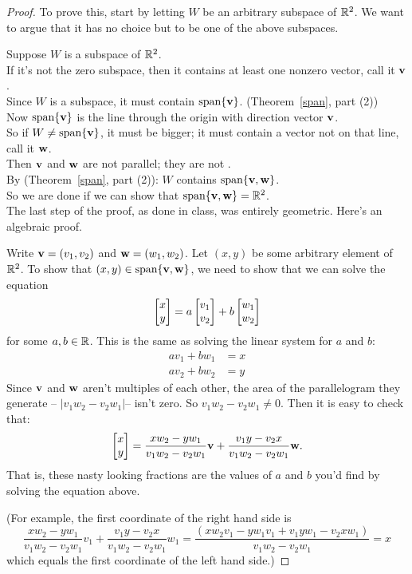 \begin{proof}
To prove this, start by letting $W$ be an arbitrary subspace of $\mathbb{R}^2$.
We want to argue that it has no choice but to be one of the above 
subspaces.

Suppose $W$ is a subspace of $\mathbb{R}^2$.  \\
If it's not the zero subspace,
then it contains at least one nonzero vector, call it $\mathbf{v}$.  \\
Since $W$ is a subspace, it must contain $\textrm{span}\{\mathbf{v}\}$. (Theorem~\ref{span}, part (2))\\
Now $\textrm{span}\{\mathbf{v}\}$ is the line through the origin with direction vector $\mathbf{v}$.\\
So if $W \neq \textrm{span}\{\mathbf{v}\}$, it must be bigger; it must 
 contain
a vector not on that line, call it $\mathbf{w}$.\\
Then $\mathbf{v}$ and $\mathbf{w}$ are not parallel; they are not .\\  
By (Theorem~\ref{span}, part (2)):  $W$ contains $\textrm{span}\{\mathbf{v},\mathbf{w}\}$.\\
So we are done if we can show that $\textrm{span}\{\mathbf{v},\mathbf{w}\} = \mathbb{R}^2$.\\


The last step of the proof, as done in class, was entirely geometric.
Here's an algebraic proof.

Write $\mathbf{v} = (v_1,v_2)$ and $\mathbf{w} = (w_1,w_2)$.  Let $(x,y)$
be some arbitrary element of $\mathbb{R}^2$.  To show that $(x,y) \in \textrm{span}\{\mathbf{v},\mathbf{w}\}$,
we need to show that we can solve the equation
$$
\left[ \begin{matrix} x\\y \end{matrix} \right] = a\left[ \begin{matrix} v_1\\v_2 \end{matrix} \right] + b\left[ \begin{matrix} w_1\\w_2 \end{matrix} \right]
$$
for some $a,b \in \mathbb{R}$.  This is the same as solving the linear system for $a$ and $b$:
\begin{align*}
av_1+bw_1 &= x\\
av_2+bw_2 &= y
\end{align*}
Since $\mathbf{v}$ and $\mathbf{w}$ aren't multiples of each other, the area of the parallelogram they generate  -- $|v_1w_2-v_2w_1|$-- isn't zero. So $v_1w_2-v_2w_1 \not=0$. Then it is easy to
check that:
$$
\left[ \begin{matrix} x\\y \end{matrix} \right] = \frac{xw_2-yw_1}{v_1w_2-v_2w_1}\mathbf{v} + \frac{v_1y-v_2x}{v_1w_2-v_2w_1}\mathbf{w}.
$$
That is, these nasty looking fractions are the values of $a$ and $b$ you'd find by
solving the equation above.

(For example, the first coordinate of the right hand side is
$$
\frac{xw_2-yw_1}{v_1w_2-v_2w_1}v_1 + \frac{v_1y-v_2x}{v_1w_2-v_2w_1}w_1 = 
\frac{(xw_2v_1 - yw_1v_1 + v_1yw_1 - v_2xw_1)}{v_1w_2-v_2w_1} = x
$$
which equals the first coordinate of the left hand side.)

\end{proof}

